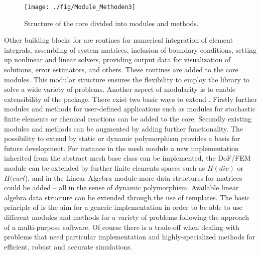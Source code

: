 \begin{figure}[ht]
\centering
\texttt{[image: ./fig/Module\_Methoden3]}
\caption{Structure of the \hiflow{} core divided into modules and
methods.}
\label{softwarekernel}
\end{figure}

Other building blocks for \hiflow{} are routines for numerical
integration of element integrals, assembling of system matrices,
inclusion of boundary conditions, setting up nonlinear and linear
solvers, providing output data for visualization of solutions, error estimators,
and others. These routines are added to the core modules. This modular
structure ensures the flexibility to employ the library to solve a
wide variety of problems. Another aspect of modularity is to enable
extensibility of the \hiflow{} package.  There exist two basic ways to
extend \hiflow{}. Firstly further modules and methods for user-defined
applications such as modules for stochastic finite elements or
chemical reactions can be added to the \hiflow{} core. Secondly
existing modules and methods can be augmented by adding further
functionality. The possibility to extend \hiflow{} by static or
dynamic polymorphism provides a basis for future development. For
instance in the mesh module a new implementation inherited from the
abstract mesh base class can be implemented, the DoF/FEM module can be
extended by further finite elements spaces such as $H(div)$ or
$H(curl$), and in the Linear Algebra module more data structures for
matrices could be added -- all in the sense of dynamic
polymorphism. Available linear algebra data structure can be extended
through the use of templates. The basic principle of \hiflow{} is the aim for a
generic implementation in order to be able to use different modules
and methods for a variety of problems following the approach of a
multi-purpose software. Of course there is a trade-off when dealing
with problems that need particular implementation and
highly-specialized methods for efficient, robust and accurate
simulations.

